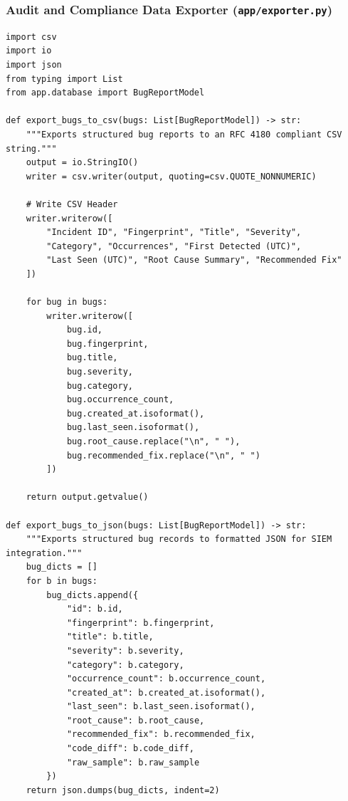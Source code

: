 \documentclass[12pt,a4paper]{article}
\begin{document}
\subsubsection{Audit and Compliance Data Exporter (\texttt{app/exporter.py})}
\begin{lstlisting}[style=pystyle, caption={Automated CSV, Excel, and JSON Audit Exporter}]
import csv
import io
import json
from typing import List
from app.database import BugReportModel

def export_bugs_to_csv(bugs: List[BugReportModel]) -> str:
    """Exports structured bug reports to an RFC 4180 compliant CSV string."""
    output = io.StringIO()
    writer = csv.writer(output, quoting=csv.QUOTE_NONNUMERIC)
    
    # Write CSV Header
    writer.writerow([
        "Incident ID", "Fingerprint", "Title", "Severity", 
        "Category", "Occurrences", "First Detected (UTC)", 
        "Last Seen (UTC)", "Root Cause Summary", "Recommended Fix"
    ])
    
    for bug in bugs:
        writer.writerow([
            bug.id,
            bug.fingerprint,
            bug.title,
            bug.severity,
            bug.category,
            bug.occurrence_count,
            bug.created_at.isoformat(),
            bug.last_seen.isoformat(),
            bug.root_cause.replace("\n", " "),
            bug.recommended_fix.replace("\n", " ")
        ])
        
    return output.getvalue()

def export_bugs_to_json(bugs: List[BugReportModel]) -> str:
    """Exports structured bug records to formatted JSON for SIEM integration."""
    bug_dicts = []
    for b in bugs:
        bug_dicts.append({
            "id": b.id,
            "fingerprint": b.fingerprint,
            "title": b.title,
            "severity": b.severity,
            "category": b.category,
            "occurrence_count": b.occurrence_count,
            "created_at": b.created_at.isoformat(),
            "last_seen": b.last_seen.isoformat(),
            "root_cause": b.root_cause,
            "recommended_fix": b.recommended_fix,
            "code_diff": b.code_diff,
            "raw_sample": b.raw_sample
        })
    return json.dumps(bug_dicts, indent=2)
\end{lstlisting}

\clearpage
\end{document}

